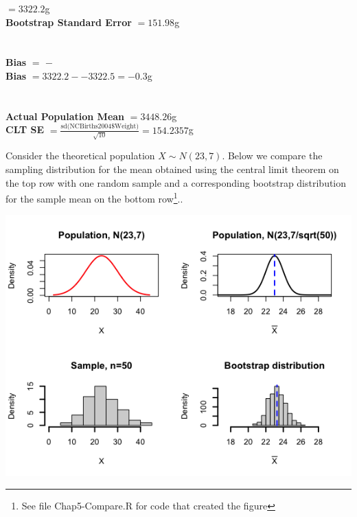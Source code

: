 \begin{multicols}{2}
\vspace{-0.25in}

\textbf{}  $= 3322.2$g \\
\textbf{Bootstrap Standard Error}   $= 151.98$g\\
\\
\\ 
\textbf{Bias} $=$ \textbf{} $-$ \textbf{}\\
\textbf{Bias} $= 3322.2--3322.5=-0.3$g \\
\\
\\
\textbf{Actual Population Mean} $= 3448.26$g\\
\textbf{CLT SE} $= \frac{\mbox{sd(NCBirths2004\$Weight)}}{\sqrt{10}}= 154.2357$g\\
\end{multicols}


\pagebreak


Consider the theoretical population $X \sim N(23,7)$. Below we compare the sampling distribution for the mean obtained using the central limit theorem on the top row with one random sample and a corresponding bootstrap distribution for the sample mean on the bottom row\footnote{See file Chap5-Compare.R for code that created the figure}..

\begin{center}
\includegraphics[width=0.75\tw]{11/fig-compare2.png}
\end{center}

